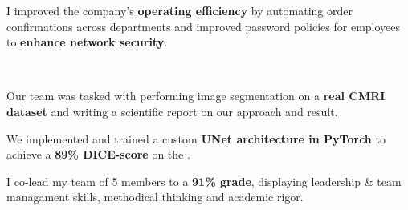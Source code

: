 \documentclass[]{jonas-cv}
\begin{document}
\begin{minipage}[t]{0.63\textwidth}

\begin{tightemize}
    \item[\angleDoubleRightSymbol] I improved the company's \textbf{operating efficiency} by automating order confirmations across departments and improved password policies for employees to \textbf{enhance network security}.
\end{tightemize}
\largesectionsep

\tinysectionsep

\\
\begin{tightemize}
    \item Our team was tasked with performing image segmentation on a \textbf{real CMRI dataset}
    and writing a scientific report on our approach and result.
    \item We implemented and trained a custom \textbf{UNet architecture in PyTorch} to achieve a \textbf{89\% DICE-score} on the .
    \item[\angleDoubleRightSymbol] I co-lead my team of 5 members to a \textbf{91\% grade}, displaying leadership \& team managament skills, methodical thinking and academic rigor.
\end{tightemize}
\sectionsep





\end{minipage}
\end{document}
